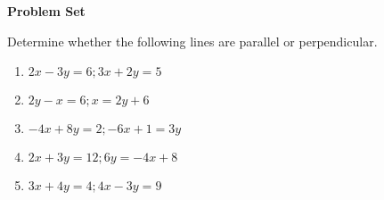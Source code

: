 \textbf{Problem Set}

\vspce

Determine whether the following lines are parallel or perpendicular.  

\begin{enumerate}[label = \arabic*. ]
\item \hspce $2x-3y=6; 3x+2y=5$
\vspce 
\item \hspce $2y-x=6; x=2y+6$
\vspce 
\item \hspce $-4x+8y=2; -6x+1=3y$
\vspce 
\item \hspce $2x+3y=12; 6y=-4x+8$
\vspce 
\item \hspce $3x+4y=4; 4x-3y=9$
\end{enumerate}  

